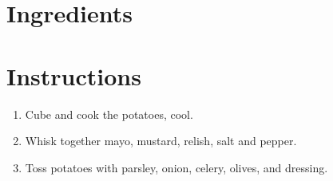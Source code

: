 \documentclass[letterpaper,10pt,english]{sphinxmanual}
\begin{document}
\section{Ingredients}
\label{\detokenize{Potato_Sal:ingredients}}
%
\begin{sphinxVerbatim}[commandchars=\\\{\}]
   
  
   
   
  
  
  
   
   
   
\end{sphinxVerbatim}


\section{Instructions}
\label{\detokenize{Potato_Sal:instructions}}\begin{enumerate}
\item {} 
Cube and cook the potatoes, cool.

\item {} 
Whisk together mayo, mustard, relish, salt and pepper.

\item {} 
Toss potatoes with parsley, onion, celery, olives, and dressing.

\end{enumerate}
\end{document}
